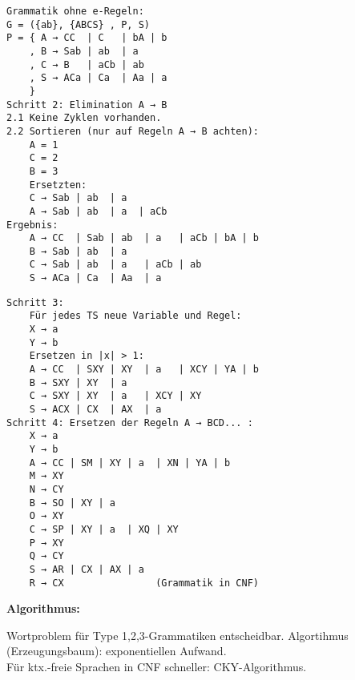 \documentclass[11pt,
			a4paper,
			parskip=full,
			toc=bib,
			toc=idx,
			toc=listof,
			ngerman
			listof=totoc,]{scrartcl}
\newcommand{\concept}[1]{%
	\sf{%
		\textbf{%
				\textcolor{mymauve}{#1}%
		}%
	}%
	\rm%
}
\newenvironment{algo}[1]%
{	\begin{framed}
	\textbf{Algorithmus:} \concept{#1}}%
{\end{framed}}
\newenvironment{expl}%
{\color{red}}
{\color{black}}
\newcommand{\compress}{\vspace{-1em}}
\begin{document}
\compress
\compress
\begin{expl}
\begin{minipage}[t]{1\linewidth}
  \begin{minipage}[t]{0.5\linewidth}
    \begin{verbatim}
Grammatik ohne e-Regeln:
G = ({ab}, {ABCS} , P, S)
P = { A → CC  | C   | bA | b     
    , B → Sab | ab  | a      
    , C → B   | aCb | ab 
    , S → ACa | Ca  | Aa | a
    }     
Schritt 2: Elimination A → B
2.1 Keine Zyklen vorhanden.
2.2 Sortieren (nur auf Regeln A → B achten):      
    A = 1
    C = 2
    B = 3
    Ersetzten:
    C → Sab | ab  | a       
    A → Sab | ab  | a  | aCb 
Ergebnis:
    A → CC  | Sab | ab  | a   | aCb | bA | b     
    B → Sab | ab  | a      
    C → Sab | ab  | a   | aCb | ab 
    S → ACa | Ca  | Aa  | a
    \end{verbatim}
  \end{minipage}
  \begin{minipage}[t]{0.5\linewidth}
    \begin{verbatim}
Schritt 3:
    Für jedes TS neue Variable und Regel:
    X → a
    Y → b
    Ersetzen in |x| > 1:
    A → CC  | SXY | XY  | a   | XCY | YA | b
    B → SXY | XY  | a
    C → SXY | XY  | a   | XCY | XY
    S → ACX | CX  | AX  | a
Schritt 4: Ersetzen der Regeln A → BCD... :
    X → a
    Y → b
    A → CC | SM | XY | a  | XN | YA | b
    M → XY
    N → CY
    B → SO | XY | a
    O → XY
    C → SP | XY | a  | XQ | XY
    P → XY
    Q → CY
    S → AR | CX | AX | a
    R → CX                (Grammatik in CNF)
    \end{verbatim}
  \end{minipage}
\end{minipage}
\end{expl}

\compress
\begin{algo}{CYK-Algorithmus} 

\compress
Wortproblem für Type 1,2,3-Grammatiken entscheidbar. Algortihmus (Erzeugungsbaum): exponentiellen Aufwand. \\
Für ktx.-freie Sprachen in CNF schneller: CKY-Algorithmus.
\end{algo}
\end{document}
